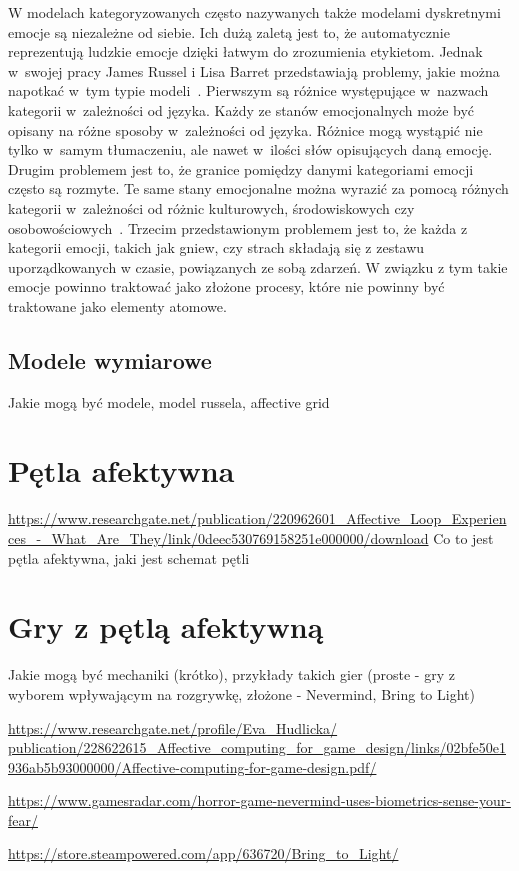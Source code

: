 W modelach kategoryzowanych często nazywanych także modelami dyskretnymi emocje są niezależne od siebie. Ich dużą zaletą jest to, że automatycznie reprezentują ludzkie emocje dzięki łatwym do zrozumienia etykietom. Jednak w~swojej pracy James Russel i Lisa Barret przedstawiają problemy, jakie można napotkać w~tym typie modeli~\cite{russel_barret_core_affect}. Pierwszym są różnice występujące w~nazwach kategorii w~zależności od języka. Każdy ze stanów emocjonalnych może być opisany na różne sposoby w~zależności od języka. Różnice mogą wystąpić nie tylko w~samym tłumaczeniu, ale nawet w~ilości słów opisujących daną emocję. Drugim problemem jest to, że granice pomiędzy danymi kategoriami emocji często są rozmyte. Te same stany emocjonalne można wyrazić za pomocą różnych kategorii w~zależności od różnic kulturowych, środowiskowych czy osobowościowych~\cite{emotion_models_review_2017}. Trzecim przedstawionym problemem jest to, że każda z kategorii emocji, takich jak gniew, czy strach składają się z zestawu uporządkowanych w czasie, powiązanych ze sobą zdarzeń. W związku z tym takie emocje powinno traktować jako złożone procesy, które nie powinny być traktowane jako elementy atomowe.

\subsection{Modele wymiarowe}

Jakie mogą być modele, model russela, affective grid

\section{Pętla afektywna}
\url{https://www.researchgate.net/publication/220962601_Affective_Loop_Experiences_-_What_Are_They/link/0deec530769158251e000000/download}
Co to jest pętla afektywna, jaki jest schemat pętli



\section{Gry z pętlą afektywną}
Jakie mogą być mechaniki (krótko), przykłady takich gier (proste - gry z wyborem wpływającym na rozgrywkę, złożone - Nevermind, Bring to Light)

\url{https://www.researchgate.net/profile/Eva_Hudlicka/ publication/228622615_Affective_computing_for_game_design/links/02bfe50e1936ab5b93000000/Affective-computing-for-game-design.pdf/}

\url{https://www.gamesradar.com/horror-game-nevermind-uses-biometrics-sense-your-fear/}

\url{https://store.steampowered.com/app/636720/Bring_to_Light/}


